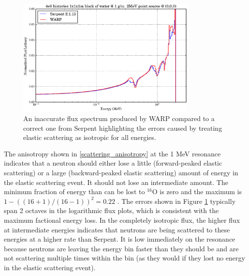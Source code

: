 \begin{figure}[h!] 
  \centering
    \includegraphics[width=0.8\textwidth]{graphics/scattering_error.eps}
     \caption{An inaccurate flux spectrum produced by WARP compared to a correct one from Serpent highlighting the errors caused by treating elastic scattering as isotropic for all energies.\label{scattering_error}}
\end{figure}

The anisotropy shown in \ref{scattering_anisotropy} at the 1 MeV resonance indicates that a neutron should either lose a little (forward-peaked elastic scattering) or a large (backward-peaked elastic scattering) amount of energy in the elastic scattering event.  It should not lose an intermediate amount.  The minimum fraction of energy than can be lost to $^{16}$O is zero and the maximum is $1-((16+1)/(16-1))^2=0.22$ \cite{duderstadt}.  The errors shown in Figure \ref{scattering_error} typically span 2 octaves in the logarithmic flux plots, which is consistent with the maximum factional energy loss.  In the completely isotropic flux, the higher flux at intermediate energies indicates that neutrons are being scattered to these energies at a higher rate than Serpent.  It is low immediately on the resonance because neutrons are leaving the energy bin faster than they should be and are not scattering multiple times within the bin (as they would if they lost no energy in the elastic scattering event).  

